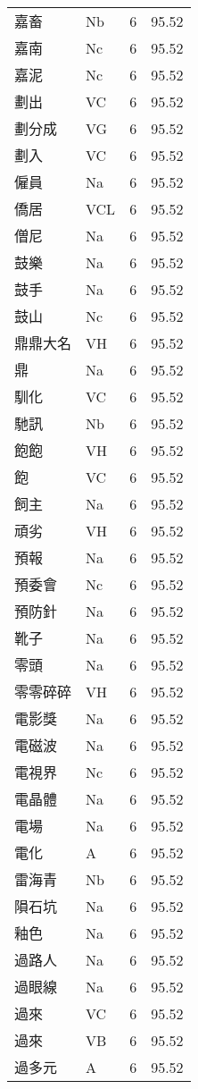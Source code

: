\documentclass[twocolumn]{book}
\begin{document}
\begin{supertabular}{llrr}
嘉畜 & Nb & 6 &  95.52\\
嘉南 & Nc & 6 &  95.52\\
嘉泥 & Nc & 6 &  95.52\\
劃出 & VC & 6 &  95.52\\
劃分成 & VG & 6 &  95.52\\
劃入 & VC & 6 &  95.52\\
僱員 & Na & 6 &  95.52\\
僑居 & VCL & 6 &  95.52\\
僧尼 & Na & 6 &  95.52\\
鼓樂 & Na & 6 &  95.52\\
鼓手 & Na & 6 &  95.52\\
鼓山 & Nc & 6 &  95.52\\
鼎鼎大名 & VH & 6 &  95.52\\
鼎 & Na & 6 &  95.52\\
馴化 & VC & 6 &  95.52\\
馳訊 & Nb & 6 &  95.52\\
飽飽 & VH & 6 &  95.52\\
飽 & VC & 6 &  95.52\\
飼主 & Na & 6 &  95.52\\
頑劣 & VH & 6 &  95.52\\
預報 & Na & 6 &  95.52\\
預委會 & Nc & 6 &  95.52\\
預防針 & Na & 6 &  95.52\\
靴子 & Na & 6 &  95.52\\
零頭 & Na & 6 &  95.52\\
零零碎碎 & VH & 6 &  95.52\\
電影獎 & Na & 6 &  95.52\\
電磁波 & Na & 6 &  95.52\\
電視界 & Nc & 6 &  95.52\\
電晶體 & Na & 6 &  95.52\\
電場 & Na & 6 &  95.52\\
電化 & A & 6 &  95.52\\
雷海青 & Nb & 6 &  95.52\\
隕石坑 & Na & 6 &  95.52\\
釉色 & Na & 6 &  95.52\\
過路人 & Na & 6 &  95.52\\
過眼線 & Na & 6 &  95.52\\
過來 & VC & 6 &  95.52\\
過來 & VB & 6 &  95.52\\
過多元 & A & 6 &  95.52\\

\end{supertabular}
\end{document}
